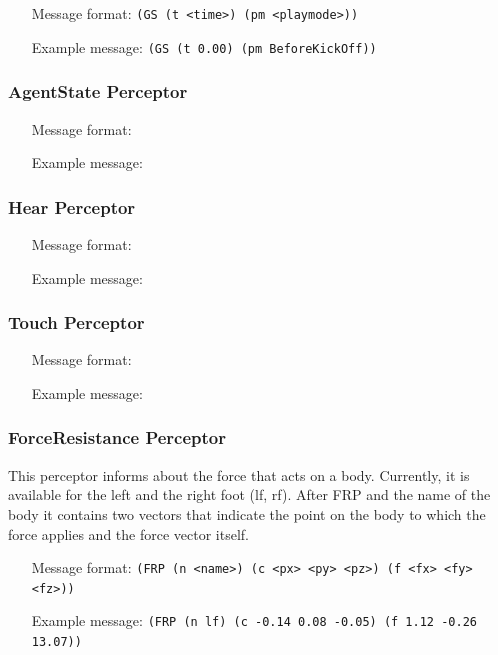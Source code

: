 \begin{itemize}
	\item[Message format:] \texttt{(GS (t <time>) (pm <playmode>))}
	\item[Example message:] \texttt{(GS (t 0.00) (pm BeforeKickOff))}
\end{itemize}

\subsubsection{AgentState Perceptor}
\begin{itemize}
	\item[Message format:] \texttt{}
	\item[Example message:] \texttt{}
\end{itemize}
\subsubsection{Hear Perceptor}
\begin{itemize}
	\item[Message format:] \texttt{}
	\item[Example message:] \texttt{}
\end{itemize}
\subsubsection{Touch Perceptor}
\begin{itemize}
	\item[Message format:] \texttt{}
	\item[Example message:] \texttt{}
\end{itemize}
\subsubsection{ForceResistance Perceptor}
This perceptor informs about the force that acts on a body. Currently, it is
available for the left and the right foot (lf, rf).
After FRP and the name of the body it contains two vectors that indicate the
point on the body to which the force applies and the force vector itself.
\begin{itemize}
	\item[Message format:] \texttt{(FRP (n <name>) (c <px> <py> <pz>) (f <fx> <fy>
	<fz>))}
	\item[Example message:] \texttt{(FRP (n lf) (c -0.14 0.08 -0.05) (f 1.12 -0.26
	13.07))}
\end{itemize}


